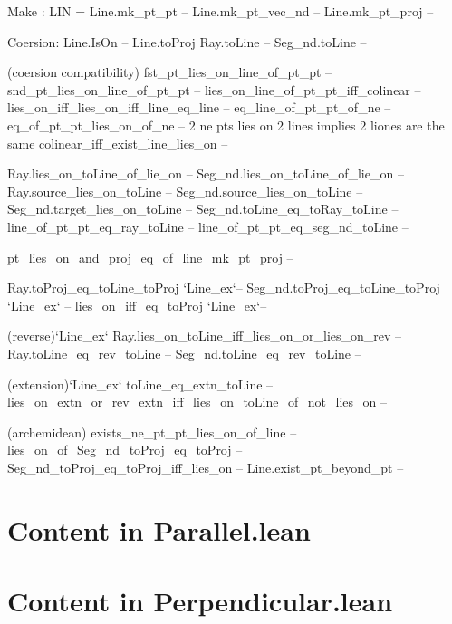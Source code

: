 \documentclass[12pt,a4paper]{article}
\begin{document}
  Make :
    LIN = Line.mk_pt_pt -- 
    Line.mk_pt_vec_nd --
    Line.mk_pt_proj --

  Coersion:
    Line.IsOn --
    Line.toProj
    Ray.toLine  --
    Seg_nd.toLine --

  (coersion compatibility)
    fst_pt_lies_on_line_of_pt_pt --
    snd_pt_lies_on_line_of_pt_pt --
    lies_on_line_of_pt_pt_iff_colinear --
    lies_on_iff_lies_on_iff_line_eq_line --
    eq_line_of_pt_pt_of_ne --
    eq_of_pt_pt_lies_on_of_ne -- 2 ne pts lies on 2 lines implies 2 liones are the same
    colinear_iff_exist_line_lies_on --

    Ray.lies_on_toLine_of_lie_on --
    Seg_nd.lies_on_toLine_of_lie_on --
    Ray.source_lies_on_toLine --
    Seg_nd.source_lies_on_toLine --
    Seg_nd.target_lies_on_toLine --
    Seg_nd.toLine_eq_toRay_toLine --
    line_of_pt_pt_eq_ray_toLine --
    line_of_pt_pt_eq_seg_nd_toLine --

    pt_lies_on_and_proj_eq_of_line_mk_pt_proj --

    Ray.toProj_eq_toLine_toProj `Line_ex`--
    Seg_nd.toProj_eq_toLine_toProj `Line_ex` --
    lies_on_iff_eq_toProj `Line_ex`--

    (reverse)`Line_ex`
    Ray.lies_on_toLine_iff_lies_on_or_lies_on_rev --
    Ray.toLine_eq_rev_toLine --
    Seg_nd.toLine_eq_rev_toLine --

    (extension)`Line_ex`
    toLine_eq_extn_toLine --
    lies_on_extn_or_rev_extn_iff_lies_on_toLine_of_not_lies_on --

    (archemidean)
    exists_ne_pt_pt_lies_on_of_line --
    lies_on_of_Seg_nd_toProj_eq_toProj --
    Seg_nd_toProj_eq_toProj_iff_lies_on --
    Line.exist_pt_beyond_pt --
    

\section{Content in Parallel.lean}



\section{Content in Perpendicular.lean}
\end{document}
